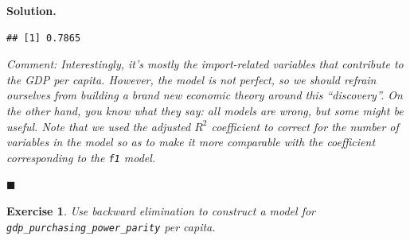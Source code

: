\documentclass[10pt,b5paper,krantz1]{krantz}
\newenvironment{Shaded}{\begin{snugshade}}{\end{snugshade}}
\newcommand{\KeywordTok}[1]{\textcolor[rgb]{0.27,0.27,0.27}{\textbf{#1}}}
\newcommand{\NormalTok}[1]{#1}
\newcommand{\OperatorTok}[1]{\textcolor[rgb]{0.43,0.43,0.43}{\textbf{#1}}}
\newtheorem{exercise}{Exercise}[chapter]
\newenvironment{solution}{%
\bigskip\noindent\textbf{Solution. }%
\it\ignorespaces%
\ignorespaces%
}{\ignorespaces%
\hfill$\blacksquare$%
}
\begin{document}
\begin{solution}
\begin{Shaded}
\end{Shaded}

\begin{verbatim}
## [1] 0.7865
\end{verbatim}

\emph{Comment: Interestingly, it's mostly the import-related variables
that contribute to the GDP per capita. However, the model
is not perfect, so we should refrain ourselves from building a brand new
economic theory around this ``discovery''. On the other hand,
you know what they say: all models are wrong, but some might be useful.
Note that we used the adjusted \(R^2\) coefficient to correct
for the number of variables in the model
so as to make it more comparable with the coefficient corresponding
to the \texttt{f1} model.}

\end{solution}

\begin{exercise}

Use backward elimination to construct a model
for \texttt{gdp\_purchasing\_power\_parity} per capita.

\end{exercise}
\end{document}
